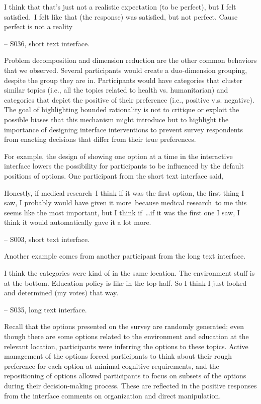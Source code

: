 \begin{displayquote}
I think that that's just not a realistic expectation (to be perfect), but I felt satisfied.~\bracketellipsis I felt like that (the response) was satisfied, but not perfect. Cause perfect is not a reality

\noindent \hfill -- S036, short text interface.
\end{displayquote}

Problem decomposition and dimension reduction are the other common behaviors that we observed. Several participants would create a duo-dimension grouping, despite the group they are in. Participants would have categories that cluster similar topics (i.e., all the topics related to health vs. humanitarian) and categories that depict the positive of their preference (i.e., positive v.s. negative). The goal of highlighting bounded rationality is not to critique or exploit the possible biases that this mechanism might introduce but to highlight the importance of designing interface interventions to prevent survey respondents from enacting decisions that differ from their true preferences.

For example, the design of showing one option at a time in the interactive interface lowers the possibility for participants to be influenced by the default positions of options. One participant from the short text interface said,
\begin{displayquote}
Honestly, if medical research~\bracketellipsis I think if it was the first option, the first thing I saw, I probably would have given it more~\bracketellipsis because medical research~\bracketellipsis to me this seems like the most important, but I think if~\ldots if it was the first one I saw, I think it would automatically gave it a lot more.
    
\noindent \hfill -- S003, short text interface.
\end{displayquote}

Another example comes from another participant from the long text interface.
\begin{displayquote}
I think the categories were kind of in the same location. The environment stuff is at the bottom. Education policy is like in the top half. So I think I just looked and determined (my votes) that way.
    
\noindent \hfill -- S035, long text interface.
\end{displayquote}
Recall that the options presented on the survey are randomly generated; even though there are some options related to the environment and education at the relevant location, participants were inferring the options to these topics. Active management of the options forced participants to think about their rough preference for each option at minimal cognitive requirements, and the repositioning of options allowed participants to focus on subsets of the options during their decision-making process. These are reflected in the positive responses from the interface comments on organization and direct manipulation. 

